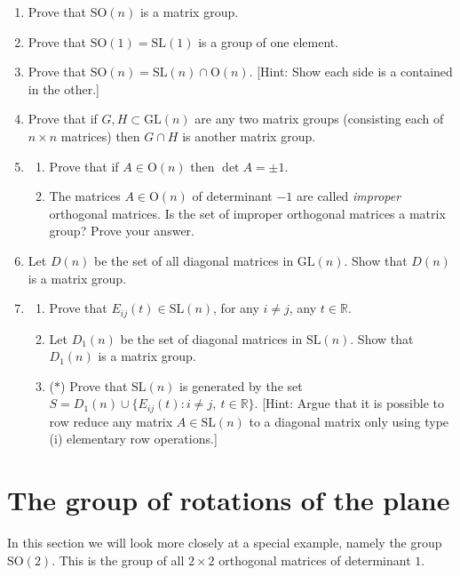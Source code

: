 \documentclass[11pt]{article}
\newenvironment{problems}
{
 \begin{enumerate}[topsep=1pt,itemsep=0pt,parsep=2pt,%
 label={\arabic*.}, ref=\arabic*] \small
}
{
 \end{enumerate}
}
\theoremstyle{definition}
\newcommand{\R}{\mathbb{R}} %
\newcommand{\GL}{\mathrm{GL}}
\newcommand{\SL}{\mathrm{SL}}
\newcommand{\Orth}{\mathrm{O}}
\newcommand{\SO}{\mathrm{SO}}
\begin{document}
\begin{problems}
\item Prove that $\SO(n)$ is a matrix group. 

\item Prove that $\SO(1) = \SL(1)$ is a group of one element. 

\item Prove that $\SO(n) = \SL(n) \cap \Orth(n)$. [Hint: Show each
  side is a contained in the other.]

\item Prove that if $G, H \subset \GL(n)$ are any two matrix groups
  (consisting each of $n \times n$ matrices) then $G \cap H$ is
  another matrix group.

\item 
  \begin{enumerate}
  \item Prove that if $A \in \Orth(n)$ then $\det A = \pm 1$. 
  \item The matrices $A \in \Orth(n)$ of determinant $-1$ are called
    \emph{improper} orthogonal matrices. Is the set of improper
    orthogonal matrices a matrix group? Prove your answer.
  \end{enumerate}

\item Let $D(n)$ be the set of all diagonal matrices in $\GL(n)$. Show
  that $D(n)$ is a matrix group.

\item 
  \begin{enumerate}
  \item Prove that $E_{ij}(t) \in \SL(n)$, for any $i \ne j$, any $t
    \in \R$.
  \item Let $D_1(n)$ be the set of diagonal matrices in $\SL(n)$. Show
    that $D_1(n)$ is a matrix group. 
  \item ($*$) Prove that $\SL(n)$ is generated by the set $S = D_1(n)
    \cup \{ E_{ij}(t) : i \ne j,\ t \in \R \}$. [Hint: Argue that it
      is possible to row reduce any matrix $A \in \SL(n)$ to a
      diagonal matrix only using type (i) elementary row operations.]
  \end{enumerate}


\end{problems}



\newpage
\section{The group of rotations of the plane}\noindent
In this section we will look more closely at a special example, namely
the group $\SO(2)$. This is the group of all $2 \times 2$ orthogonal
matrices of determinant $1$.
\end{document}
